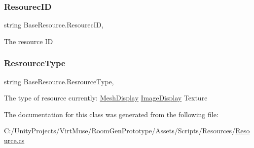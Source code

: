 \subsubsection{\texorpdfstring{Resourec\+ID}{ResourecID}}
{\footnotesize\ttfamily string Base\+Resource.\+Resourec\+ID\hspace{0.3cm}{\ttfamily [get]}, {}}



The resource ID 

\mbox{\label{class_base_resource_a226a36a32013947cb069e023324cd3af}} 
\subsubsection{\texorpdfstring{Resrource\+Type}{ResrourceType}}
{\footnotesize\ttfamily string Base\+Resource.\+Resrource\+Type\hspace{0.3cm}{\ttfamily [get]}, {}}



The type of resource currently\+: \mbox{\hyperlink{class_mesh_display}{Mesh\+Display}} \mbox{\hyperlink{class_image_display}{Image\+Display}} Texture 



The documentation for this class was generated from the following file\+:\begin{DoxyCompactItemize}
\item 
C\+:/\+Unity\+Projects/\+Virt\+Muse/\+Room\+Gen\+Prototype/\+Assets/\+Scripts/\+Resources/\mbox{\hyperlink{_resource_8cs}{Resource.\+cs}}\end{DoxyCompactItemize}
